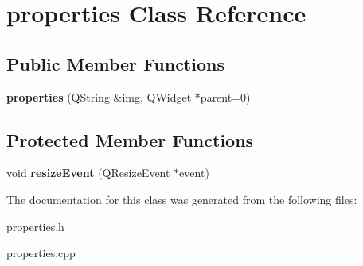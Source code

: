 \hypertarget{classproperties}{
\section{properties Class Reference}
\label{classproperties}
}
\subsection*{Public Member Functions}
\begin{DoxyCompactItemize}
\item 
\hypertarget{classproperties_aa7592a90ccdf6a691b0fa2ca54f77641}{
{\bfseries properties} (QString \&img, QWidget $\ast$parent=0)}
\label{classproperties_aa7592a90ccdf6a691b0fa2ca54f77641}

\end{DoxyCompactItemize}
\subsection*{Protected Member Functions}
\begin{DoxyCompactItemize}
\item 
\hypertarget{classproperties_ad0211b85fbce4b735d5d8ee5a6680de3}{
void {\bfseries resizeEvent} (QResizeEvent $\ast$event)}
\label{classproperties_ad0211b85fbce4b735d5d8ee5a6680de3}

\end{DoxyCompactItemize}


The documentation for this class was generated from the following files:\begin{DoxyCompactItemize}
\item 
properties.h\item 
properties.cpp\end{DoxyCompactItemize}
